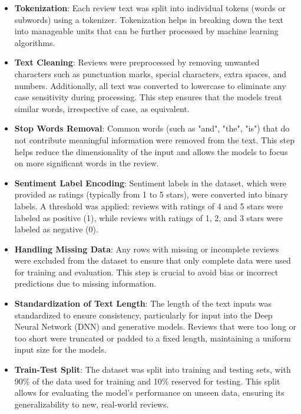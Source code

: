\documentclass{article}
\begin{document}
\begin{itemize}
    \item \textbf{Tokenization}: Each review text was split into individual tokens (words or subwords) using a tokenizer. Tokenization helps in breaking down the text into manageable units that can be further processed by machine learning algorithms.
    
    \item \textbf{Text Cleaning}: Reviews were preprocessed by removing unwanted characters such as punctuation marks, special characters, extra spaces, and numbers. Additionally, all text was converted to lowercase to eliminate any case sensitivity during processing. This step ensures that the models treat similar words, irrespective of case, as equivalent.
    
    \item \textbf{Stop Words Removal}: Common words (such as "and", "the", "is") that do not contribute meaningful information were removed from the text. This step helps reduce the dimensionality of the input and allows the models to focus on more significant words in the review.
    
    \item \textbf{Sentiment Label Encoding}: Sentiment labels in the dataset, which were provided as ratings (typically from 1 to 5 stars), were converted into binary labels. A threshold was applied: reviews with ratings of 4 and 5 stars were labeled as positive (1), while reviews with ratings of 1, 2, and 3 stars were labeled as negative (0).
    
    \item \textbf{Handling Missing Data}: Any rows with missing or incomplete reviews were excluded from the dataset to ensure that only complete data were used for training and evaluation. This step is crucial to avoid bias or incorrect predictions due to missing information.
    
    \item \textbf{Standardization of Text Length}: The length of the text inputs was standardized to ensure consistency, particularly for input into the Deep Neural Network (DNN) and generative models. Reviews that were too long or too short were truncated or padded to a fixed length, maintaining a uniform input size for the models.
    
    \item \textbf{Train-Test Split}: The dataset was split into training and testing sets, with 90\% of the data used for training and 10\% reserved for testing. This split allows for evaluating the model's performance on unseen data, ensuring its generalizability to new, real-world reviews.
\end{itemize}
\end{document}
